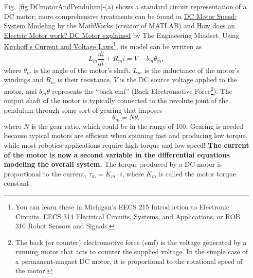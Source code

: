\begin{center}
\setlength{\fboxrule}{2pt}  %
\end{center}

Fig.~\ref{fig:DCmotorAndPendulum}-(a) shows a standard circuit representation of a DC motor; more comprehensive treatments can be found in \href{https://ctms.engin.umich.edu/CTMS/index.php?example=MotorSpeed&section=SystemModeling}{DC Motor Speed: System Modeling} by the MathWorks (creator of MATLAB) and \href{https://youtu.be/GQatiB-JHdI}{How does an Electric Motor work? DC Motor explained} by The Engineering Mindset. Using \href{https://en.wikipedia.org/wiki/Kirchhoff%27s_circuit_laws}{Kirchoff's Current and Voltage Laws}\footnote{You can learn these in Michigan's EECS 215 Introduction to Electronic Circuits, EECS 314 Electrical Circuits, Systems, and Applications, or ROB 310 Robot Sensors and Signals.}, its model can be written as 
\begin{equation}
\label{eq:DddotqPendulumTake03}
   L_m \frac{d i}{dt} + R_m i = V - b_m \dot{\theta}_m,
\end{equation}
where $\theta_m$ is the angle of the motor's shaft, $L_m$ is the inductance of the motor's windings and $R_m$ is their resistance, $V$ is the DC source voltage applied to the motor, and $ b_m \dot{\theta}$ represents the ``back emf'' (Back Electromotive Force\footnote{The back (or counter) electromotive force (emf) is the voltage generated by a running motor that acts to counter the supplied voltage. In the simple case of a permanent-magnet DC motor, it is proportional to the rotational speed of the motor.}). The output shaft of the motor is typically connected to the revolute joint of the pendulum through some sort of gearing that imposes 
$$ \theta_m = N \theta,$$
where $N$ is the gear ratio, which could be in the range of 100. Gearing is needed because typical motors are efficient when spinning fast and producing low torque, while most robotics applications require high torque and low speed! \textbf{The current of the motor is now a second variable in the differential equations modeling the overall system.} The torque produced by a DC motor is proportional to the current, $\tau_m = K_m \cdot i$, where $K_m$ is called the motor torque constant. 

